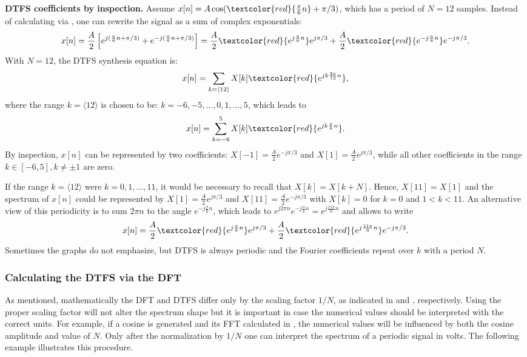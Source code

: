 \bExample \textbf{DTFS coefficients by inspection.}
Assume $x[n] = A \cos (\textcolor{red}{ \frac{\pi}{6} n } + \pi/3)$, which has a period of $N=12$ samples. Instead of calculating via , one can rewrite the signal as a sum of complex exponentials:
\[
x[n] = \frac{A}{2} \left[ e^{j(\frac{\pi}{6} n + \pi/3)} + e^{-j(\frac{\pi}{6} n + \pi/3)} \right] =
 \frac{A}{2} \textcolor{red}{ e^{j\frac{\pi}{6} n}}  e^{j\pi/3} + \frac{A}{2} \textcolor{red}{ e^{-j\frac{\pi}{6} n}}  e^{-j\pi/3}.
\]
With $N=12$, the DTFS synthesis equation is:
\[
x[n] = \sum_{k=\langle 12\rangle} X[k] \textcolor{red}{ e^{j k \frac{2 \pi}{12}  n}},
\]
where the range $k=\langle 12\rangle$ is chosen to be: $k=-6,-5,\ldots,0,1,\ldots,5$, which leads to
\[
x[n] = \sum_{k=-6}^5 X[k] \textcolor{red}{ e^{j k \frac{\pi}{6}n}}.
\]
By inspection, $x[n]$ can be represented by two coefficients: $X[-1] = \frac{A}{2} e^{-j\pi/3}$ and $X[1] = \frac{A}{2} e^{j\pi/3}$, while all other coefficients in the range $k \in [-6,5], k \ne \pm 1$ are zero.

If the range $k=\langle 12\rangle$ were $k=0,1,\ldots,11$, it would be necessary to recall that $X[k]=X[k+N]$. Hence, $X[11]=X[1]$ and the spectrum of $x[n]$ could be represented by $X[1]=\frac{A}{2} e^{j\pi/3}$ and $X[11]=\frac{A}{2} e^{-j\pi/3}$ with $X[k]=0$ for $k=0$ and $1<k<11$.
An alternative view of this periodicity is to sum $2 \pi n$ to the angle $e^{-j\frac{\pi}{6} n}$, which leads to $e^{j 2 \pi n}e^{-j\frac{\pi}{6} n} = e^{j\frac{11\pi}{6} n}$ and allows to write
\[
x[n] = \frac{A}{2} \textcolor{red}{ e^{j\frac{\pi}{6} n}}  e^{j\pi/3} + \frac{A}{2} \textcolor{red}{ e^{j\frac{11\pi}{6} n}}  e^{-j\pi/3}.
\]
Sometimes the graphs do not emphasize, but DTFS is always periodic and the Fourier coefficients repeat over $k$ with a period $N$.
\eExample


\subsubsection{Calculating the DTFS via the DFT}

As mentioned, mathematically the DFT and DTFS differ only by the scaling factor $1/N$, as indicated in  and 
, respectively. Using the proper scaling factor will not alter the spectrum shape but it is important in case the numerical values should be interpreted with the correct units. For example, if a cosine is generated and its FFT calculated in {\matlab}, the numerical values will be influenced by both the cosine amplitude and value of $N$. Only after the normalization by $1/N$ one can interpret the spectrum of a periodic signal in volts.
The following example illustrates this procedure.


